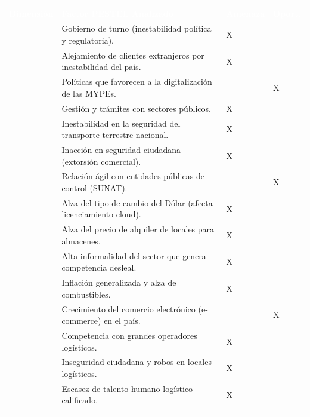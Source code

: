 \documentclass[11pt]{article}
\newcounter{none} %
\begin{document}
\vspace{0.3cm}
\setlength{\tabcolsep}{5pt}
\renewcommand{\arraystretch}{1.5}
{\def\LTcaptype{none}
\begin{longtable}[]{@{}
  >{\raggedright\arraybackslash}p{0.14\linewidth}
  >{\raggedright\arraybackslash}p{0.62\linewidth}
  >{\centering\arraybackslash}p{0.12\linewidth}
  >{\centering\arraybackslash}p{0.12\linewidth}@{}}
\rowcolor{DeepNavy}
\textcolor{white}{\textbf{Dimensión}} & \textcolor{white}{\textbf{Factor PESTEL Analizado}} & \textcolor{white}{\textbf{Amenaza}} & \textcolor{white}{\textbf{Oport.}} \\ \hline
\endhead
\multirow{7}{=}{\textbf{POLÍTICO}} & Gobierno de turno (inestabilidad política y regulatoria). & X & \\ \cline{2-4}
& Alejamiento de clientes extranjeros por inestabilidad del país. & X & \\ \cline{2-4}
& Políticas que favorecen a la digitalización de las MYPEs. & & X \\ \cline{2-4}
& Gestión y trámites con sectores públicos. & X & \\ \cline{2-4}
& Inestabilidad en la seguridad del transporte terrestre nacional. & X & \\ \cline{2-4}
& Inacción en seguridad ciudadana (extorsión comercial). & X & \\ \cline{2-4}
& Relación ágil con entidades públicas de control (SUNAT). & & X \\ \hline
\rowcolor{LightGray}
\multirow{6}{=}{\textbf{ECONÓMICO}} & Alza del tipo de cambio del Dólar (afecta licenciamiento cloud). & X & \\ \cline{2-4}
\rowcolor{LightGray}
& Alza del precio de alquiler de locales para almacenes. & X & \\ \cline{2-4}
\rowcolor{LightGray}
& Alta informalidad del sector que genera competencia desleal. & X & \\ \cline{2-4}
\rowcolor{LightGray}
& Inflación generalizada y alza de combustibles. & X & \\ \cline{2-4}
\rowcolor{LightGray}
& Crecimiento del comercio electrónico (e-commerce) en el país. & & X \\ \cline{2-4}
\rowcolor{LightGray}
& Competencia con grandes operadores logísticos. & X & \\ \hline
\multirow{5}{=}{\textbf{SOCIAL}} & Inseguridad ciudadana y robos en locales logísticos. & X & \\ \cline{2-4}
& Escasez de talento humano logístico calificado. & X & \\ \cline{2-4}

\end{longtable}}
\end{document}
